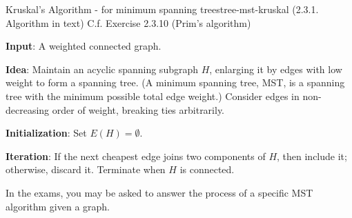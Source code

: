 \documentclass[../src/handouts/main.tex]{subfiles}
\begin{document}
\begin{algorithm}{Kruskal's Algorithm - for minimum spanning trees}{tree-mst-kruskal}
  (2.3.1. Algorithm in text) C.f. Exercise 2.3.10 (Prim's algorithm)

  \textbf{Input}: A weighted connected graph.

  \textbf{Idea}: Maintain an acyclic spanning subgraph $H$, enlarging it by edges with low weight to form a spanning tree. (A minimum spanning tree, MST, is a spanning tree with the minimum possible total edge weight.) Consider edges in non-decreasing order of weight, breaking ties arbitrarily. 

  \textbf{Initialization}: Set $E(H) = \emptyset$.

  \textbf{Iteration}: If the next cheapest edge joins two components of $H$, then include it; otherwise, discard it. Terminate when $H$ is connected.
\end{algorithm}

In the exams, you may be asked to answer the process of a specific MST algorithm given a graph.
\end{document}
